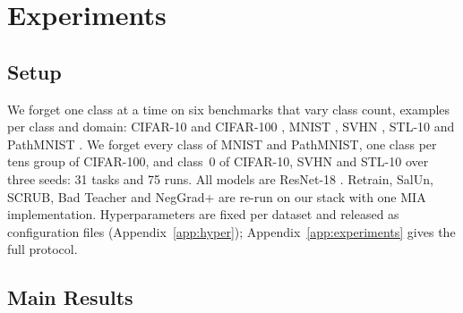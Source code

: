 \documentclass{article}
\theoremstyle{remark}
\theoremstyle{plain}
\begin{document}
\section{Experiments}\label{sec:experiments}

\subsection{Setup}\label{sec:setup}

We forget one class at a time on six benchmarks that vary class count, examples
per class and domain: CIFAR-10 and CIFAR-100 \citep{krizhevsky2009cifar}, MNIST
\citep{lecun1998mnist}, SVHN \citep{netzer2011svhn}, STL-10
\citep{coates2011stl10} and PathMNIST \citep{yang2023medmnist}. We forget every
class of MNIST and PathMNIST, one class per tens group of CIFAR-100, and class~0
of CIFAR-10, SVHN and STL-10 over three seeds: 31 tasks and 75 runs. All models
are ResNet-18 \citep{he2016resnet}. Retrain, SalUn, SCRUB, Bad Teacher and
NegGrad+ are re-run on our stack with one MIA implementation. Hyperparameters are
fixed per dataset and released as configuration files
(Appendix~\ref{app:hyper}); Appendix~\ref{app:experiments} gives the full
protocol.

\subsection{Main Results}\label{sec:main_results}
\end{document}
